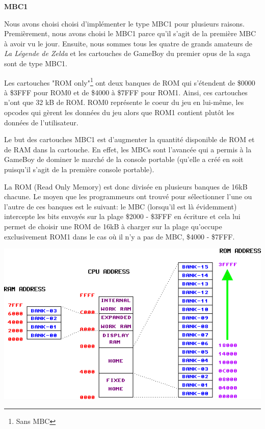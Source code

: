 \documentclass[12pt, a4paper]{article}
\begin{document}
\bigskip

\begin{center}{\bf MBC1}\end{center}
\bigskip



Nous avons choisi choisi d'implémenter le type MBC1 pour plusieurs raisons. Premièrement, nous avons choisi le MBC1 parce qu'il s'agit de la première MBC à avoir vu le jour. Ensuite, nous sommes tous les quatre de grands amateurs de \textit{La Légende de Zelda} et les cartouches de GameBoy du premier opus de la saga sont de type MBC1.
\bigskip

Les cartouches "ROM only"\footnote{Sans MBC} ont deux banques de ROM qui s'étendent de \$0000 à \$3FFF pour ROM0 et de \$4000 à \$7FFF pour ROM1. Ainsi, ces cartouches n'ont que 32 kB de ROM. ROM0 représente le coeur du jeu en lui-même, les opcodes qui gèrent les données du jeu alors que ROM1 contient plutôt les données de l'utilisateur.
\bigskip

Le but des cartouches MBC1 est d'augmenter la quantité disponible de ROM et de RAM dans la cartouche. En effet, les MBCs sont l'avancée qui a permis à la GameBoy de dominer le marché de la console portable (qu'elle a créé en soit puisqu'il s'agit de la première console portable).
\bigskip

\pagebreak
La ROM (Read Only Memory) est donc divisée en plusieurs banques de 16kB chacune. Le moyen que les programmeurs ont trouvé pour sélectionner l'une ou l'autre de ces banques est le suivant: le MBC (lorsqu'il est là évidemment) intercepte les bits envoyés sur la plage \$2000 - \$3FFF en écriture et cela lui permet de choisir une ROM de 16kB à charger sur la plage qu'occupe exclusivement ROM1 dans le cas où il n'y a pas de MBC, \$4000 - \$7FFF.  
\bigskip

\includegraphics[width = 15 cm]{memory1.png}
\bigskip
\end{document}
